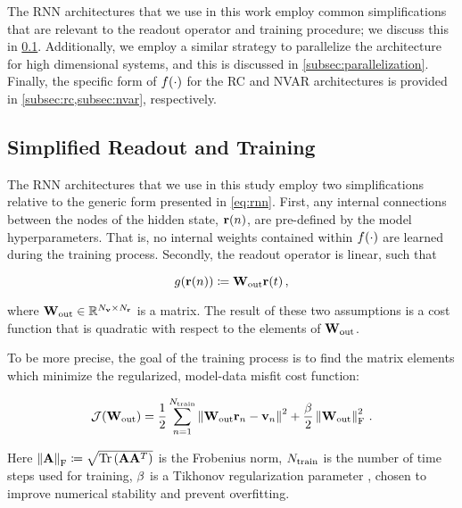 The RNN architectures that we use in this work employ common
simplifications that are relevant to the readout operator and training
procedure; we discuss this in \cref{subsec:readout}.
Additionally, we employ a similar strategy to parallelize the architecture for
high dimensional systems, and this is discussed in
\cref{subsec:parallelization}.
Finally, the specific form of $f(\cdot)$ for the RC and NVAR architectures
is provided in \cref{subsec:rc,subsec:nvar},
respectively.


\subsection{Simplified Readout and Training}
\label{subsec:readout}

The RNN architectures that we use in this study employ two
simplifications relative to the generic form presented in
\cref{eq:rnn}.
First, any internal connections between the nodes of the hidden state,
$\mathbf{r}(n)$, are pre-defined by the model hyperparameters.
That is, no internal weights contained within $f(\cdot)$
are learned during the training process.
Secondly, the readout operator is linear, such that
\begin{linenomath*}\begin{equation*}
    g(\mathbf{r}(n)) \coloneqq \mathbf{W}_\text{out} \mathbf{r}(t) \, ,
\end{equation*}\end{linenomath*}
where $\mathbf{W}_\text{out} \in \mathbb{R}^{N_{\mathbf{v}}\times N_{\mathbf{r}}}$ is a matrix.
The result of these two assumptions is a cost function that is quadratic with
respect to the elements of $\mathbf{W}_\text{out}$.

To be more precise, the goal of the training process is to find the matrix
elements which minimize the regularized, model-data misfit cost function:
\begin{linenomath*}\begin{equation}
    \mathcal{J}(\mathbf{W}_\text{out}) =
        \dfrac{1}{2}\sum_{n=1}^{N_\text{train}} \left\lVert\mathbf{W}_\text{out} \mathbf{r}_n - \mathbf{v}_n\right\rVert^2
        +
        \dfrac{\beta}{2}\left\lVert\mathbf{W}_\text{out}\right\rVert_\text{F}^2 \, .
    \label{eq:cost}
\end{equation}\end{linenomath*}
Here
$\left\lVert\mathbf{A}\right\rVert_\text{F} \coloneqq
\sqrt{\text{Tr}\left(\mathbf{A}\mathbf{A}^T\right)}$
is the Frobenius norm,
$N_\text{train}$ is the number of time steps used for training,
$\beta$ is a Tikhonov regularization parameter \citep{tikhonov_solution_1963}, chosen to improve
numerical stability and prevent overfitting.

